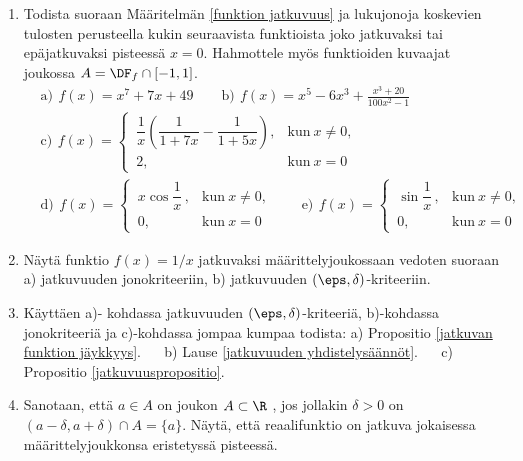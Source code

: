 \Harj
\begin{enumerate}

\item
Todista suoraan Määritelmän \ref{funktion jatkuvuus} ja lukujonoja koskevien tulosten
perusteella kukin seuraavista funktioista joko jatkuvaksi tai epäjatkuvaksi pisteessä $x=0$.
Hahmottele myös funktioiden kuvaajat joukossa $A=\DF_f\cap[-1,1]$.
\begin{align*}
&\text{a)}\,\ f(x)=x^7+7x+49 \qquad 
 \text{b)}\,\ f(x)=x^5-6x^3+\frac{x^3+20}{100x^2-1} \\
&\text{c)}\,\ f(x)=\begin{cases} 
                   \,\dfrac{1}{x}\left(\dfrac{1}{1+7x}-\dfrac{1}{1+5x}\right), 
                                                       &\text{kun}\ x \neq 0, \\[2mm]
                   \,2,                                &\text{kun}\ x=0
                   \end{cases} \\
&\text{d)}\,\ f(x)=\begin{cases}
                   \,x\cos\dfrac{1}{x}\,, &\text{kun}\ x \neq 0, \\[2mm]
                   \,0,                   &\text{kun}\ x=0
                   \end{cases} \qquad
 \text{e)}\,\ f(x)=\begin{cases}
                   \,\sin\dfrac{1}{x}\,, &\text{kun}\ x \neq 0, \\[2mm]
                   \,0,                  &\text{kun}\ x=0
                   \end{cases}
\end{align*}

\item \label{abs{x}:n jatkuvuus}
Näytä funktio $f(x)=1/x$ jatkuvaksi määrittelyjoukossaan vedoten suoraan a) jatkuvuuden
jonokriteeriin, b) jatkuvuuden $(\eps,\delta)$-kriteeriin.

\item \label{H-V-1: todistuksia}
Käyttäen a)- kohdassa jatkuvuuden $(\eps,\delta)$-kriteeriä, b)-kohdassa jonokriteeriä
ja c)-kohdassa jompaa kumpaa todista: \vspace{1mm}\newline
a) Propositio \ref{jatkuvan funktion jäykkyys}. $\quad$
b) Lause \ref{jatkuvuuden yhdistelysäännöt}. $\quad$
c) Propositio \ref{jatkuvuuspropositio}.

\item \label{H-V-1: eristetty piste} 
Sanotaan, että $a \in A$ on joukon $A\subset\R$ , jos jollakin
$\delta>0$ on $(a-\delta,a+\delta) \cap A = \{a\}$. Näytä, että reaalifunktio on jatkuva
jokaisessa määrittelyjoukkonsa eristetyssä pisteessä.


\end{enumerate}
